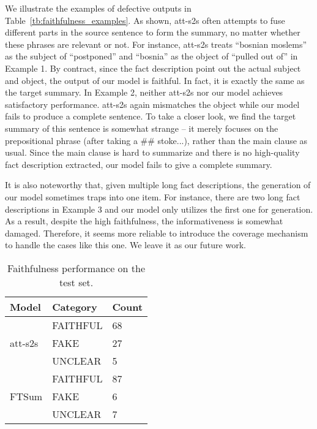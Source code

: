 \documentclass[letterpaper]{article} \usepackage{aaai18}  \usepackage{times}  \usepackage{helvet}  \usepackage{courier}  \usepackage{url}  \usepackage{graphicx}  \usepackage{amsfonts}
\begin{document}
	We illustrate the examples of defective outputs in Table~\ref{tb:faithfulness_examples}.
	As shown, att-s2s often attempts to fuse different parts in the source sentence to form the summary, no matter whether these phrases are relevant or not.
	For instance, att-s2s treats ``bosnian moslems'' as the subject of ``postponed'' and ``bosnia'' as the object of ``pulled out of'' in Example 1.
	By contract, since the fact description point out the actual subject and object, the output of our model is faithful.
	In fact, it is exactly the same as the target summary. 
	In Example 2, neither att-s2s nor our model achieves satisfactory performance.
	att-s2s again mismatches the object while our model fails to produce a complete sentence.
	To take a closer look, we find the target summary of this sentence is somewhat strange -- it merely focuses on the prepositional phrase (after taking a \#\# stoke...), rather than the main clause as usual.
	Since the main clause is hard to summarize and there is no high-quality fact description extracted, our model fails to give a complete summary.
	
	It is also noteworthy that, given multiple long fact descriptions, the generation of our model sometimes traps into one item.
	For instance, there are two long fact descriptions in Example 3 and our model only utilizes the first one for generation.
	As a result, despite the high faithfulness, the informativeness is somewhat damaged.
	Therefore, it seems more reliable to introduce the coverage mechanism~\cite{see2017get} to handle the cases like this one.
	We leave it as our future work.


	\begin{table}
		\centering
		\begin{tabular}{l|ll}
			\hline
			Model                    & Category    & Count \\ \hline
			\multirow{3}{*}{att-s2s} & FAITHFUL       & 68    \\
			& FAKE & 27    \\
			& UNCLEAR  & 5     \\ \hline
			\multirow{3}{*}{FTSum}   & FAITHFUL       & 87    \\
			& FAKE & 6     \\
			& UNCLEAR  & 7     \\ \hline
		\end{tabular}
		\caption{Faithfulness performance on the test set.}
		\label{tb:validation}
	\end{table}
	
\end{document}

